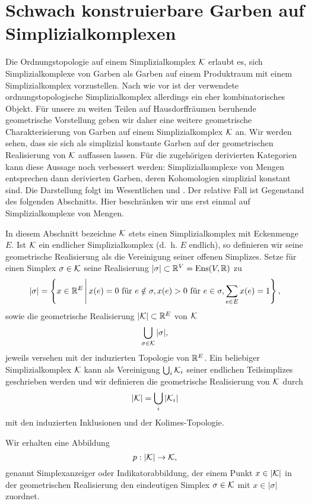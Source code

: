 
\section{Schwach konstruierbare Garben auf Simplizialkomplexen}
\label{sec:simp-comp-sk}

Die Ordnungstopologie auf einem Simplizialkomplex $\mathcal{K}$ erlaubt es,
sich Simplizialkomplexe von Garben als Garben auf einem Produktraum
mit einem Simplizialkomplex vorzustellen. Nach wie vor ist der
verwendete ordnungstopologische Simplizialkomplex allerdings ein eher
kombinatorisches Objekt. Für unsere zu weiten Teilen auf
Hausdorffräumen beruhende geometrische Vorstellung geben wir daher
eine weitere geometrische Charakterisierung von Garben auf einem
Simplizialkomplex $\mathcal{K}$ an. Wir werden sehen, dass sie sich als
simplizial konstante Garben auf der geometrischen Realisierung von
$\mathcal{K}$ auffassen lassen. Für die zugehörigen derivierten Kategorien kann
diese Aussage noch verbessert werden: Simplizialkomplexe von Mengen
entsprechen dann derivierten Garben, deren Kohomologien simplizial
konstant sind. Die Darstellung folgt im Wesentlichen \cite{KS} und
\cite{WS}. Der relative Fall ist Gegenstand des folgenden
Abschnitts. Hier beschränken wir uns erst einmal auf
Simplizialkomplexe von Mengen.

In diesem Abschnitt bezeichne $\mathcal{K}$ stets einen Simplizialkomplex mit
Eckenmenge $E$. Ist $\mathcal{K}$ ein endlicher Simplizialkomplex (d.~h. $E$
endlich), so definieren wir seine geometrische Realisierung als die
Vereinigung seiner offenen Simplizes. Setze für einen Simplex $\sigma
\in \mathcal{K}$ seine Realisierung $|\sigma| \subset \mathbb{R}^V = \operatorname{Ens}(V, \mathbb{R})$ zu
\[ |\sigma| = \left\{ x \in \mathbb{R}^E \,\middle|\, x(e) = 0 \text{ für } e \notin \sigma,
   x(e) > 0 \text{ für } e \in \sigma,
   \sum_{e \in E} x(e) = 1  \right\},
\]
sowie die geometrische Realisierung $|\mathcal{K}| \subset \mathbb{R}^E$ von $\mathcal{K}$
\[ \bigcup_{\sigma \in \mathcal{K}} |\sigma|, \]
jeweils versehen mit der induzierten Topologie von $\mathbb{R}^E$. Ein
beliebiger Simplizialkomplex $\mathcal{K}$ kann als Vereinigung $\bigcup_i
\mathcal{K}_i$ seiner endlichen Teilsimplizes geschrieben werden und wir
definieren die geometrische Realisierung von $\mathcal{K}$ durch
\[ |\mathcal{K}| = \bigcup_i |\mathcal{K}_i| \]
mit den induzierten Inklusionen und der Kolimes-Topologie.

Wir erhalten eine Abbildung
\[ p: |\mathcal{K}| \to \mathcal{K}, \]
genannt Simplexanzeiger oder Indikatorabbildung, der einem Punkt $x
\in |\mathcal{K}|$ in der geometrischen Realisierung den eindeutigen Simplex
$\sigma \in \mathcal{K}$ mit $x \in |\sigma|$ zuordnet.

